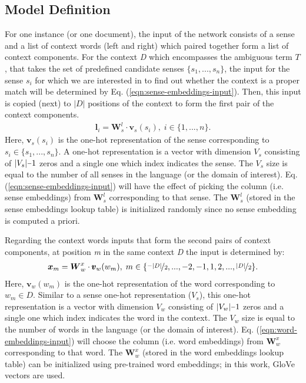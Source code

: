\documentclass{llncs}
\newcommand{\minus}{\scalebox{0.75}[1.0]{$-$}}
\begin{document}
\subsection{Model Definition}
For one instance (or one document), the input of the network consists of a sense and a list of context words (left and right) which paired together form a list of context components. For the context \textit{D} which encompasses the ambiguous term $\textit{T}$, that takes the set of predefined candidate senses $\{s_1, ..., s_n\}$, the input for the sense $\textit{s}_i$ for which we are interested in to find out whether the context is a proper match will be determined by Eq. (\ref{eqn:sense-embeddings-input}). Then, this input is copied (next) to $|D|$ positions of the context to form the first pair of the context components.
\begin{align}
\label{eqn:sense-embeddings-input}
\boldsymbol{l}_{i} = \boldsymbol{W}_s^l\cdot\pmb{v}_s(s_i), \; i\in\{1, ..., n\}.
\end{align}
Here, $\pmb{v}_s(s_i)$ is the one-hot representation of the sense corresponding to $s_i \in \{s_1, ..., s_n\}$. A one-hot representation is a vector with dimension $V_s$ consisting of $|V_s| \minus 1$ zeros and a single one which index indicates the sense. The $V_s$ size is equal to the number of all senses in the language (or the domain of interest). Eq. (\ref{eqn:sense-embeddings-input}) will have the effect of picking the column (i.e. sense embeddings) from $\boldsymbol{W}_s^l$ corresponding to that sense. The $\boldsymbol{W}_s^l$ (stored in the sense embeddings lookup table) is initialized randomly since no sense embedding is computed a priori.


Regarding the context words inputs that form the second pairs of context components, at position \textit{m} in the same context \textit{D} the input is determined by:
\begin{align}
\label{eqn:word-embeddings-input}
\boldsymbol{x}_{m} = \boldsymbol{W}_w^x\cdot\pmb{v}_w(w_m), \; m\in\{\nicefrac{-|D|}{2}, ..., -2, -1, 1, 2, ..., \nicefrac{|D|}{2}\}.
\end{align}
Here, $\pmb{v}_w(w_m)$ is the one-hot representation of the word corresponding to $w_m \in D$. Similar to a sense one-hot representation ($V_s$), this one-hot representation is a vector with dimension $V_w$ consisting of $|V_w| \minus 1$ zeros and a single one which index indicates the word in the context. The $V_w$ size is equal to the number of words in the language (or the domain of interest). Eq. (\ref{eqn:word-embeddings-input}) will choose the column (i.e. word embeddings) from $\boldsymbol{W}_w^x$ corresponding to that word. The $\boldsymbol{W}_w^x$ (stored in the word embeddings lookup table) can be initialized using pre-trained word embeddings; in this work, GloVe vectors are used.\\
\end{document}
